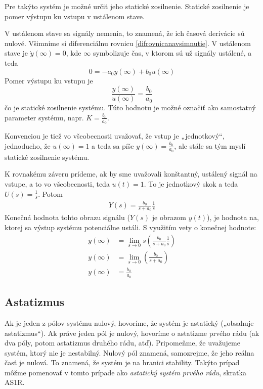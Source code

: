 \documentclass[a4paper, 10pt, ]{article}
\begin{document}
Pre takýto systém je možné určiť jeho statické zosilnenie. Statické zosilnenie je pomer výstupu ku vstupu v ustálenom stave.

V ustálenom stave sa signály nemenia, to znamená, že ich časová derivácie sú nulové. Všimnime si diferenciálnu rovnicu \eqref{difrovnicanavsimnutie}. V ustálenom stave je $\dot y(\infty) = 0$, kde $\infty$ symbolizuje čas, v ktorom sú už signály ustálené, a teda
\begin{equation}
    0 = -a_0 y(\infty) + b_0 u(\infty)
\end{equation}
Pomer výstupu ku vstupu je
\begin{equation}
    \frac{y(\infty)}{u(\infty)} = \frac{b_0}{a_0}
\end{equation}
čo je statické zosilnenie systému. Túto hodnotu je možné označiť ako samostatný parameter systému, napr. $K = \frac{b_0}{a_0}$.

Konvenciou je tiež vo všeobecnosti uvažovať, že vstup je „jednotkový“, jednoducho, že $u(\infty) = 1$ a teda sa píše $y(\infty) = \frac{b_0 }{a_0}$, ale stále sa tým myslí statické zosilnenie systému.

K rovnakému záveru prídeme, ak by sme uvažovali konštantný, ustálený signál na vstupe, a to vo všeobecnosti, teda $u(t) = 1$. To je jednotkový skok a teda $U(s) = \frac{1}{s}$. Potom
\begin{align}
    Y(s) = \frac{b_0}{s + a_0} \frac{1}{s}
\end{align}
Konečná hodnota tohto obrazu signálu ($Y(s)$ je obrazom $y(t)$), je hodnota na, ktorej sa výstup systému potenciálne ustáli. S využitím vety o konečnej hodnote:
\begin{subequations}
    \begin{align}
        y(\infty) &= \lim_{s \to 0} s \left( \frac{b_0}{s + a_0} \frac{1}{s} \right) \\
        y(\infty) &= \lim_{s \to 0} \left( \frac{b_0}{s + a_0}  \right) \\
        y(\infty) &=  \frac{b_0}{a_0}
    \end{align}
\end{subequations}



\subsection{Astatizmus}

Ak je jeden z pólov systému nulový, hovoríme, že systém je astatický („obsahuje astatizmus“). Ak práve jeden pól je nulový, hovoríme o astatizme prvého rádu (ak dva póly, potom astatizmus druhého rádu, atď). Pripomeňme, že uvažujeme systém, ktorý nie je nestabilný. Nulový pól znamená, samozrejme, že jeho reálna časť je nulová. To znamená, že systém je na hranici stability. Takýto prípad môžme pomenovať v tomto prípade ako \emph{astatický systém prvého rádu}, skratka AS1R.
\end{document}
